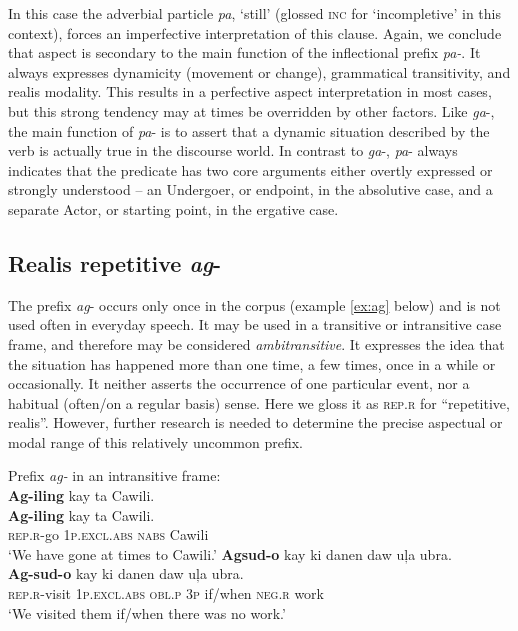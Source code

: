 In this case the adverbial particle \textit{pa}, ‘still’ (glossed \textsc{inc} for ‘incompletive’ in this context), forces an imperfective interpretation of this clause. Again, we conclude that aspect is secondary to the main function of the inflectional prefix \textit{pa-}. It always expresses dynamicity (movement or change), grammatical transitivity, and realis modality. This results in a perfective aspect interpretation in most cases, but this strong tendency may at times be overridden by other factors. Like \textit{ga}-, the main function of \textit{pa}- is to assert that a dynamic situation described by the verb is actually true in the discourse world. In contrast to \textit{ga}{}-, \textit{pa}{}- always indicates that the predicate has two core arguments either overtly expressed or strongly understood – an Undergoer, or endpoint, in the absolutive case, and a separate Actor, or starting point, in the ergative case.
\subsection{Realis repetitive \textit{ag}{}-}
\label{sec:realisrepetitive}

The prefix \textit{ag}{}- occurs only once in the corpus (example \ref{ex:ag} below) and is not used often in everyday speech. It may be used in a transitive or intransitive case frame, and therefore may be considered \textit{ambitransitive}. It expresses the idea that the situation has happened more than one time, a few times, once in a while or occasionally. It neither asserts the occurrence of one particular event, nor a habitual (often/on a regular basis) sense. Here we gloss it as \textsc{rep.r} for “repetitive, realis”. However, further research is needed to determine the precise aspectual or modal range of this relatively uncommon prefix.

\ea
Prefix \textit{ag-} in an intransitive frame: \\
\textbf{Ag-iling}  kay  ta  Cawili. \\\smallskip
 \gll \textbf{Ag-iling}  kay  ta  Cawili. \\
\textsc{rep.r}-go  1\textsc{p.excl.abs}  \textsc{nabs}  Cawili \\
\glt ‘We have gone at times to Cawili.’
\z
\ea
\textbf{Agsud-o}  kay  ki  danen  daw  uļa  ubra. \\\smallskip
 \gll \textbf{Ag-sud-o}  kay  ki  danen  daw  uļa  ubra. \\
\textsc{rep.r}-visit  1\textsc{p.excl.abs}  \textsc{obl.p}  3\textsc{p}  if/when  \textsc{neg.r}  work \\
\glt ‘We visited them if/when there was no work.’
\z

